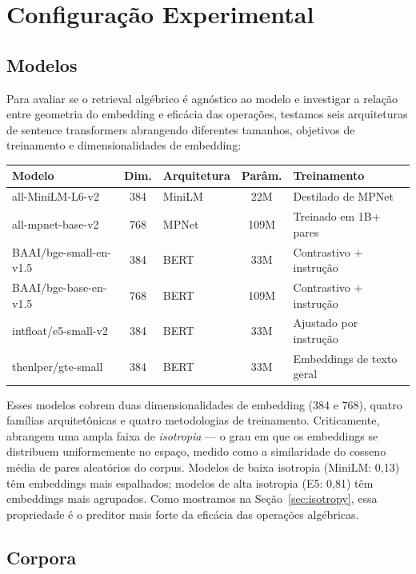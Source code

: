 \documentclass{article}
\begin{document}
\section{Configuração Experimental}

\subsection{Modelos}

Para avaliar se o retrieval algébrico é agnóstico ao modelo e investigar a relação entre geometria do embedding e eficácia das operações, testamos seis arquiteturas de sentence transformers abrangendo diferentes tamanhos, objetivos de treinamento e dimensionalidades de embedding:

\begin{table}[h]
\centering
\begin{tabular}{lclcl}
\toprule
Modelo & Dim. & Arquitetura & Parâm. & Treinamento \\
\midrule
all-MiniLM-L6-v2 & 384 & MiniLM & 22M & Destilado de MPNet \\
all-mpnet-base-v2 & 768 & MPNet & 109M & Treinado em 1B+ pares \\
BAAI/bge-small-en-v1.5 & 384 & BERT & 33M & Contrastivo + instrução \\
BAAI/bge-base-en-v1.5 & 768 & BERT & 109M & Contrastivo + instrução \\
intfloat/e5-small-v2 & 384 & BERT & 33M & Ajustado por instrução \\
thenlper/gte-small & 384 & BERT & 33M & Embeddings de texto geral \\
\bottomrule
\end{tabular}
\end{table}

Esses modelos cobrem duas dimensionalidades de embedding (384 e 768), quatro famílias arquitetônicas e quatro metodologias de treinamento. Criticamente, abrangem uma ampla faixa de \emph{isotropia} --- o grau em que os embeddings se distribuem uniformemente no espaço, medido como a similaridade do cosseno média de pares aleatórios do corpus. Modelos de baixa isotropia (MiniLM: 0,13) têm embeddings mais espalhados; modelos de alta isotropia (E5: 0,81) têm embeddings mais agrupados. Como mostramos na Seção~\ref{sec:isotropy}, essa propriedade é o preditor mais forte da eficácia das operações algébricas.

\subsection{Corpora}
\end{document}
